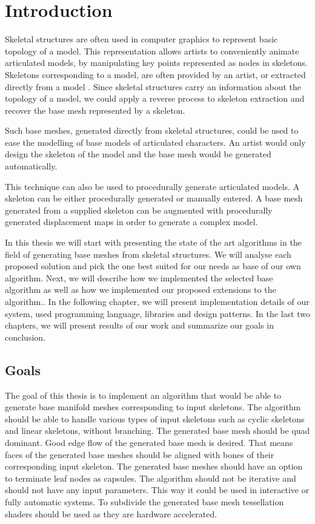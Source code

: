 \chapter*{Introduction}

Skeletal structures are often used in computer graphics to represent basic topology of a model.
This representation allows artists to conveniently animate articulated models, by manipulating key points represented as nodes in skeletons.
Skeletons corresponding to a model, are often provided by an artist, or extracted directly from a model \cite{laplac}.
Since skeletal structures carry an information about the topology of  a model, we could apply a reverse process to skeleton extraction and recover the base mesh represented by a skeleton.

Such base meshes, generated directly from skeletal structures, could be used to ease the modelling of base models of articulated characters.
An artist would only design the skeleton of the model and the base mesh would be generated automatically.

This technique can also be used to procedurally generate articulated models.
A skeleton can be either procedurally generated or manually entered.
A base mesh generated from a supplied skeleton can be augmented with procedurally generated displacement maps in order to generate a complex model.

In this thesis we will start with presenting the state of the art algorithms in the field of generating base meshes from skeletal structures.
We will analyse each proposed solution and pick the one best suited for our needs as base of our own algorithm.
Next, we will describe how we implemented the selected base algorithm as well as how we implemented our proposed extensions to the algorithm..
In the following chapter, we will present implementation details of our system, used programming language, libraries and design patterns.
In the last two chapters, we will present results of our work and summarize our goals in conclusion.

\pagebreak

\section*{Goals}

The goal of this thesis is to implement an algorithm that would be able to generate base manifold meshes corresponding to input skeletons.
The algorithm should be able to handle various types of input skeletons such as cyclic skeletons and linear skeletons, without branching.
The generated base mesh should be quad dominant.
Good edge flow of the generated base mesh is desired.
That means faces of the generated base meshes should be aligned with bones of their corresponding input skeleton.
The generated base meshes should have an option to terminate leaf nodes as capsules.
The algorithm should not be iterative and should not have any input parameters.
This way it could be used in interactive or fully automatic systems.
To subdivide the generated base mesh tessellation shaders should be used as they are hardware accelerated.